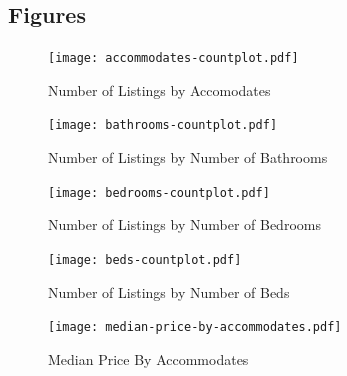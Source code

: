 

\subsection{Figures}

\begin{figure}[H] \centering
    \texttt{[image: accommodates-countplot.pdf]}
    \caption{Number of Listings by Accomodates}
    \label{fig:accommodates-countplot}
\end{figure}

\begin{figure}[H] \centering
    \texttt{[image: bathrooms-countplot.pdf]}
    \caption{Number of Listings by Number of Bathrooms }
    \label{fig:bathrooms-countplot}
\end{figure}

\begin{figure}[H] \centering
    \texttt{[image: bedrooms-countplot.pdf]}
    \caption{Number of Listings by Number of Bedrooms }
    \label{fig:bedrooms-countplot}
\end{figure}

\begin{figure}[H] \centering
    \texttt{[image: beds-countplot.pdf]}
    \caption{Number of Listings by Number of Beds }
    \label{fig:beds-countplot}
\end{figure}

\begin{figure}[H] \centering
    \texttt{[image: median-price-by-accommodates.pdf]}
    \caption{Median Price By Accommodates}
    \label{fig:median-price-by-accommodates}
\end{figure}

